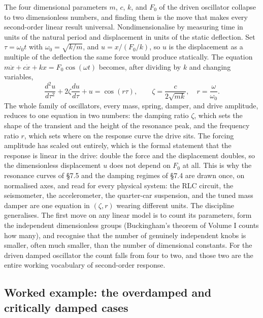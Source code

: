 \begin{mastery}
The four dimensional parameters $m$, $c$, $k$, and $F_{0}$ of the driven
oscillator collapse to two dimensionless numbers, and finding them is
the move that makes every second-order linear result universal.
Nondimensionalise by measuring time in units of the natural period and
displacement in units of the static deflection. Set $\tau = \omega_{0}
t$ with $\omega_{0} = \sqrt{k/m}$, and $u = x/(F_{0}/k)$, so $u$ is the
displacement as a multiple of the deflection the same force would
produce statically. The equation $m\ddot{x} + c\dot{x} + kx =
F_{0}\cos(\omega t)$ becomes, after dividing by $k$ and changing
variables,
\[
\frac{d^{2}u}{d\tau^{2}} + 2\zeta\frac{du}{d\tau} + u = \cos(r\tau),
\qquad
\zeta = \frac{c}{2\sqrt{mk}}, \quad r = \frac{\omega}{\omega_{0}}.
\]
The whole family of oscillators, every mass, spring, damper, and drive
amplitude, reduces to one equation in two numbers: the damping ratio
$\zeta$, which sets the shape of the transient and the height of the
resonance peak, and the frequency ratio $r$, which sets where on the
response curve the drive sits. The forcing amplitude has scaled out
entirely, which is the formal statement that the response is linear in
the drive: double the force and the displacement doubles, so the
dimensionless displacement $u$ does not depend on $F_{0}$ at all. This
is why the resonance curves of \S7.5 and the damping regimes of \S7.4
are drawn once, on normalised axes, and read for every physical system:
the RLC circuit, the seismometer, the accelerometer, the quarter-car
suspension, and the tuned mass damper are one equation in $(\zeta, r)$
wearing different units. The discipline generalises. The first move on
any linear model is to count its parameters, form the independent
dimensionless groups (Buckingham's theorem of Volume I counts how many),
and recognise that the number of genuinely independent knobs is smaller,
often much smaller, than the number of dimensional constants. For the
driven damped oscillator the count falls from four to two, and those two
are the entire working vocabulary of second-order response.
\end{mastery}



\subsection{Worked example: the overdamped and critically damped cases}

